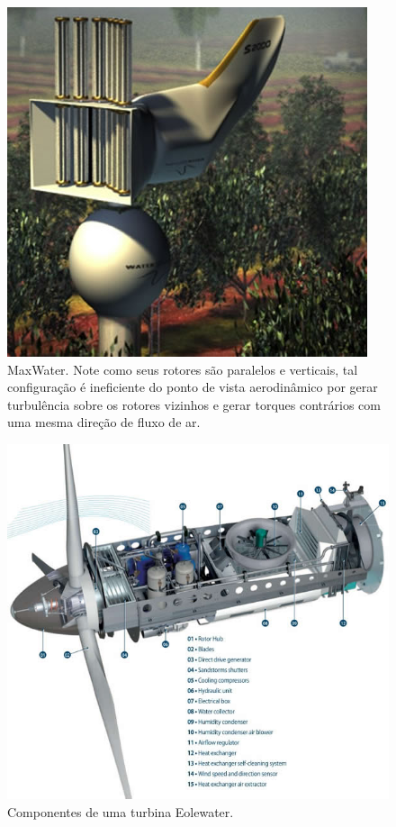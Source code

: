 \begin{figure}[!ht]
\centering
\includegraphics[scale=0.6]{editaveis/figuras/max_water}
\caption[MaxWater]{MaxWater. Note como seus rotores são paralelos e verticais, tal configuração é ineficiente do ponto
	de vista aerodinâmico por gerar turbulência sobre os rotores vizinhos e gerar torques contrários com uma mesma 
	direção de fluxo de ar.\footnotemark}

\label{max_water_turbina}
\end{figure}

\begin{figure}[!htbp]
\centering
\includegraphics[scale=0.6]{editaveis/figuras/Componentes}
\caption[Componentes de uma turbina Eolewater.]{Componentes de uma turbina Eolewater.\footnotemark}
\FloatBarrier
\label{Eole_Water}
\end{figure}

